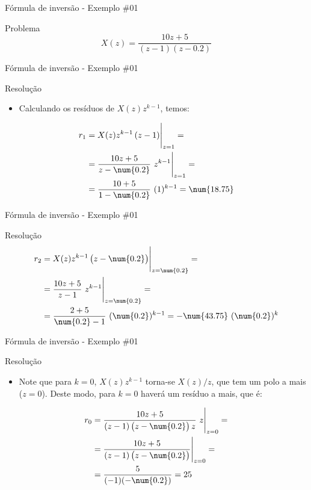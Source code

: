 \begin{frame}{Fórmula de inversão - Exemplo \#01}
\begin{block}{Problema}
	\[ X(z)=\dfrac{10z+5}{
		\left(z-1\right)
		\left(z-\num{0.2}\right)} \]
\end{block}
\end{frame}

\begin{frame}{Fórmula de inversão - Exemplo \#01}
\begin{block}{Resolução}
\begin{itemize}
    \item Calculando os resíduos de $X(z)z^{k-1}$, temos:
\end{itemize}
\begin{align*}
r_1&=\eval{X(z)z^{k-1}\left(z-1\right)}_{z=1}= \\
&= \eval{\dfrac{10z+5}{z-\num{0.2}} \ z^{k-1}}_{z=1}= \\
&= \dfrac{10+5}{1-\num{0.2}} \ (1)^{k-1} = \num{18.75}
\end{align*}
\end{block}
\end{frame}

\begin{frame}{Fórmula de inversão - Exemplo \#01}
\begin{block}{Resolução}
\begin{align*}
r_2 &=\eval{X(z)z^{k-1}\left(z-\num{0.2}\right)}_{z=\num{0.2}}= \\
&= \eval{\dfrac{10z+5}{z-1} \ z^{k-1}}_{z=\num{0.2}}= \\
&= \dfrac{2+5}{\num{0.2}-1} \ (\num{0.2})^{k-1} = -\num{43.75} \ (\num{0.2})^k
\end{align*}
\end{block}
\end{frame}

\begin{frame}{Fórmula de inversão - Exemplo \#01}
\begin{block}{Resolução}
\begin{itemize}
    \item Note que para $k = 0$, $X(z)z^{k-1}$ torna-se $X(z)/z$, que  tem um polo a mais ($z = 0$). Deste modo, para $k = 0$ haverá um resíduo a mais, que é:
\end{itemize}
\begin{align*}
r_0 &=\eval{\dfrac{10z+5}{\left(z-1\right)\left(z-\num{0.2}\right)z} \ z}_{z=0}= \\
&= \eval{\dfrac{10z+5}{\left(z-1\right)\left(z-\num{0.2}\right)}}_{z=0} = \\
&= \dfrac{5}{(-1)(-\num{0.2})}=25
\end{align*}
\end{block}
\end{frame}

